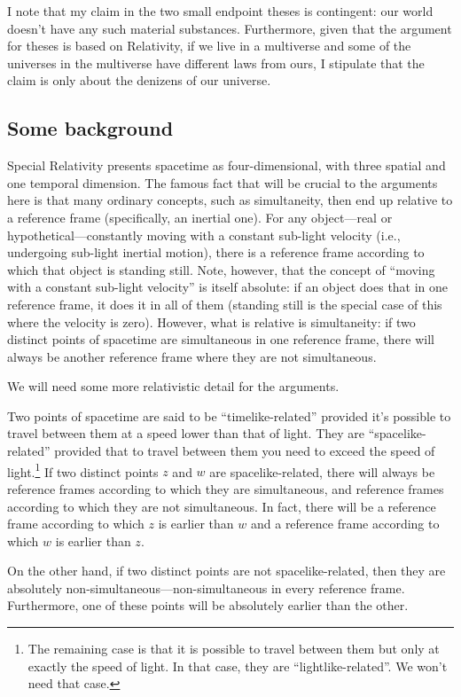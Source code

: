 I note that my claim in the two small endpoint theses is contingent: our world doesn't have any such material substances.
Furthermore, given that the argument for theses is based on Relativity, if we live in a multiverse and some of the
universes in the multiverse have different laws from ours, I stipulate that the claim is only about the denizens of 
our universe.

\subsection{Some background}
Special Relativity presents spacetime as four-dimensional, with three spatial and one temporal dimension.
The famous fact that will be crucial to the arguments here is that many ordinary concepts, such as simultaneity,
then end up relative to a reference frame (specifically, an inertial one). For any object---real or hypothetical---constantly 
moving with a constant sub-light velocity (i.e., undergoing sub-light inertial motion), there is a reference frame according 
to which that object 
is standing still. Note, however, that the concept of ``moving with a constant sub-light velocity'' is itself absolute: 
if an object does that in one reference frame, it does it in all of them (standing still is the special case of this where
the velocity is zero). However, what is relative is simultaneity: if two distinct points of spacetime are simultaneous in one 
reference frame, there will always be another reference frame where they are not simultaneous. 

We will need some more relativistic detail for the arguments. 

Two points of spacetime are said to be ``timelike-related'' provided it's possible to travel between them 
at a speed lower than that of light. They are ``spacelike-related'' provided that to travel between them 
you need to exceed the speed of light.\footnote{The remaining case is that it is possible to travel between 
them but only at exactly the speed of light. In that case, they are ``lightlike-related''. We won't need that 
case.} If two distinct points $z$ and $w$ are spacelike-related, there will always be reference frames according to which they are 
simultaneous, and reference frames according to which they are not simultaneous. In fact, there will be a reference frame
according to which $z$ is earlier than $w$ and a reference frame according to which $w$ is earlier than $z$. 

On the other hand, if two distinct points are not spacelike-related, then they are absolutely non-simultaneous---non-simultaneous 
in every reference frame. Furthermore, one of these points will be absolutely earlier than the other.

